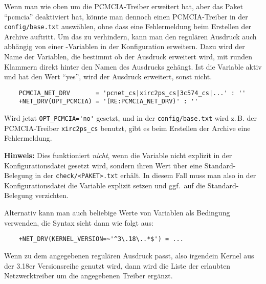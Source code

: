 Wenn man  wie oben um die PCMCIA-Treiber erweitert hat, aber
das Paket "`pcmcia"' deaktiviert hat, könnte man dennoch einen PCMCIA-Treiber
in der \texttt{config/base.txt} auswählen, ohne dass eine Fehlermeldung beim
Erstellen der Archive auftritt. Um das zu verhindern, kann man den regulären
Ausdruck auch abhängig von einer -Variablen in der Konfiguration
erweitern. Dazu wird der Name der Variablen, die bestimmt ob der Ausdruck
erweitert wird, mit runden Klammern direkt hinter den Namen des Ausdrucks
gehängt. Ist die Variable aktiv und hat den Wert "`yes"', wird der Ausdruck erweitert,
sonst nicht.

\begin{example}
\begin{verbatim}
    PCMCIA_NET_DRV       = 'pcnet_cs|xirc2ps_cs|3c574_cs|...' : ''
    +NET_DRV(OPT_PCMCIA) = '(RE:PCMCIA_NET_DRV)' : ''
\end{verbatim}
\end{example}

Wird jetzt \verb+OPT_PCMCIA='no'+ gesetzt, und in der \texttt{config/base.txt} wird z.\,B. der
PCMCIA-Treiber \texttt{xirc2ps\_cs} benutzt, gibt es beim Erstellen der Archive eine
Fehlermeldung.

\textbf{Hinweis:} Dies funktioniert \emph{nicht}, wenn die Variable nicht
explizit in der Konfigurationsdatei gesetzt wird, sondern ihren Wert
über eine Standard-Belegung in der \texttt{check/<PAKET>.txt} erhält. In
diesem Fall muss man also in der Konfigurationsdatei die Variable explizit
setzen und ggf.\ auf die Standard-Belegung verzichten.


Alternativ kann man auch beliebige Werte von Variablen als Bedingung
verwenden, die Syntax sieht dann wie folgt aus:

\begin{example}
\begin{verbatim}
    +NET_DRV(KERNEL_VERSION=~'^3\.18\..*$') = ...
\end{verbatim}
\end{example}

Wenn  zu dem angegebenen regulären Ausdruck passt, also
irgendein Kernel aus der 3.18er Versionsreihe genutzt wird, dann wird die Liste der
erlaubten Netzwerktreiber um die angegebenen Treiber ergänzt.

